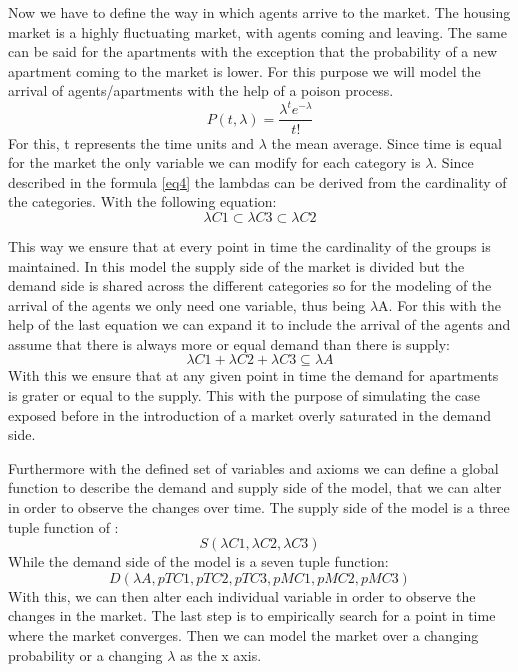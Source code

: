 Now we have to define the way in which agents arrive to the market. The housing market is a highly fluctuating market, with agents coming and leaving. The same can be said for the apartments with the exception that the probability of a new apartment coming to the market is lower. For this purpose we will model the arrival of agents/apartments with the help of a poison process. 
\begin{equation} \label{eq5}
P(t, \lambda) = \frac{\lambda^t e^{-\lambda}}{t!} 
\end{equation}
For this, t represents the time units and $\lambda$ the mean average. Since time is equal for the market the only variable we can modify for each category is $\lambda$. Since described in the formula \ref{eq4} the lambdas can be derived from the cardinality of the categories. With the following equation:
\begin{equation} \label{eq6}
\lambda C1 \subset \lambda C3 \subset \lambda C2
\end{equation}

This way we ensure that at every point in time the cardinality of the groups is maintained. In this model the supply side of the market is divided but the demand side is shared across the different categories so for the modeling of the arrival of the agents we only need one variable, thus being $\lambda$A. For this with the help of the last equation we can expand it to include the arrival of the agents and assume that there is always more or equal demand than there is supply:
\begin{equation} \label{eq7}
\lambda C1 + \lambda C2 + \lambda C3 \subseteq \lambda A
\end{equation}
With this we ensure that at any given point in time the demand for apartments is grater or equal to the supply. This with the purpose of simulating the case exposed before in the introduction of a market overly saturated in the demand side.

Furthermore with the defined set of variables and axioms we can define a global function to describe the demand and supply side of the model, that we can alter in order to observe the changes over time. The supply side of the model is a three tuple function of :
\begin{equation} \label{eq8}
S(\lambda C1, \lambda C2, \lambda C3)
\end{equation}
While the demand side of the model is a seven tuple function:
\begin{equation} \label{eq9}
D(\lambda A, pTC1, pTC2, pTC3, pMC1, pMC2, pMC3)
\end{equation}
With this, we can then alter each individual variable in order to observe the changes in the market. The last step is to empirically search for a point in time where the market converges. Then we can model the market over a changing probability or a changing $\lambda$ as the x axis.

